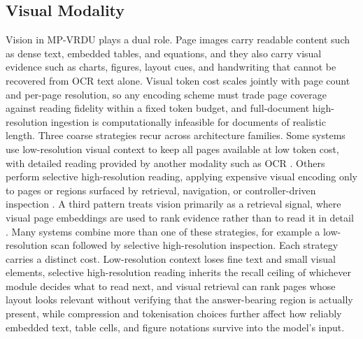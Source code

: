 \documentclass[11pt]{article}
\begin{document}
\subsection{Visual Modality}
Vision in MP-VRDU plays a dual role. Page images carry readable content such as dense text, embedded tables, and equations, and they also carry visual evidence such  as charts, figures, layout cues, and handwriting that cannot be recovered from OCR text alone. Visual token cost scales jointly with page count and per-page resolution, so any encoding scheme must trade page coverage against reading fidelity  within a fixed token budget, and full-document high-resolution ingestion is computationally infeasible for documents of realistic length. Three coarse strategies recur across architecture families. Some systems use low-resolution visual context to keep all pages available at low token cost, with detailed reading provided by another modality such as OCR \cite{tito2023hierarchical, blau2024gram, borchmann2025arctic}. Others perform selective high-resolution reading, applying expensive visual encoding only to pages or regions surfaced by retrieval, navigation, or controller-driven inspection \cite{hu2025mplug, zheng2026doc, jain2025simpledoc}. A third pattern treats vision primarily as a retrieval signal, where visual page embeddings are used to rank evidence rather than to read it in detail \cite{cho2024m3docrag, tanaka2025vdocrag, li2025avir}. Many systems combine more than one of these strategies, for example a low-resolution scan followed by selective high-resolution inspection. Each strategy carries a distinct cost. Low-resolution context loses fine text and small visual elements, selective high-resolution reading inherits the recall ceiling of whichever module decides what to read next, and visual retrieval can rank pages whose layout looks relevant without verifying that the answer-bearing region is actually present, while compression and tokenisation choices further affect how reliably embedded text, table cells, and figure notations survive into the model's input.
\end{document}
